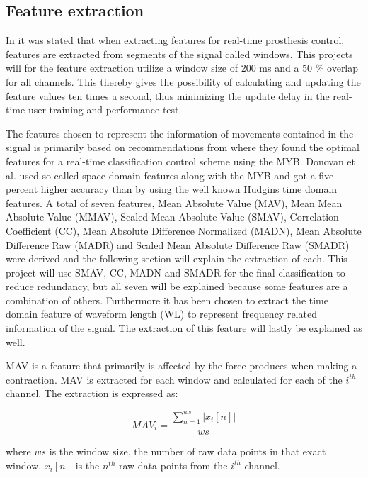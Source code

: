\subsection{Feature extraction} \label{sub:M:featureExtraction}

In  it was stated that when extracting features for real-time prosthesis control, features are extracted from segments of the signal called windows. This projects will for the feature extraction utilize a window size of 200 ms and a 50 \% overlap for all channels. This thereby gives the possibility of calculating and updating the feature values ten times a second, thus minimizing the update delay in the real-time user training and performance test.  

The features chosen to represent the information of movements contained in the signal is primarily based on recommendations from \cite{Donovan2017} where they found the optimal features for a real-time classification control scheme using the MYB. Donovan et al. \cite{Donovan2017} used so called space domain features along with the MYB and got a five percent higher accuracy than by using the well known Hudgins time domain features. A total of seven features, Mean Absolute Value (MAV), Mean Mean Absolute Value (MMAV), Scaled Mean Absolute Value (SMAV), Correlation Coefficient (CC), Mean Absolute Difference Normalized (MADN), Mean Absolute Difference Raw (MADR) and Scaled Mean Absolute Difference Raw (SMADR) were derived and the following section will explain the extraction of each. This project will use SMAV, CC, MADN and SMADR for the final classification to reduce redundancy, but all seven will be explained because some features are a combination of others. \cite{Donovan2017} Furthermore it has been chosen to extract the time domain feature of waveform length (WL) to represent frequency related information of the signal. The extraction of this feature will lastly be explained as well. 

MAV is a feature that primarily is affected by the force produces when making a contraction. MAV is extracted for each window and calculated for each of the $i^{th}$ channel. The extraction is expressed as:

\begin{equation} \label{eq:MAV}
MAV_i=\frac{\sum_{n=1}^{ws}|x_i[n]|}{ws}
\end{equation}
  
where $ws$ is the window size, the number of raw data points in that exact window. $x_i[n]$ is the $n^{th}$ raw data points from the $i^{th}$ channel.  

